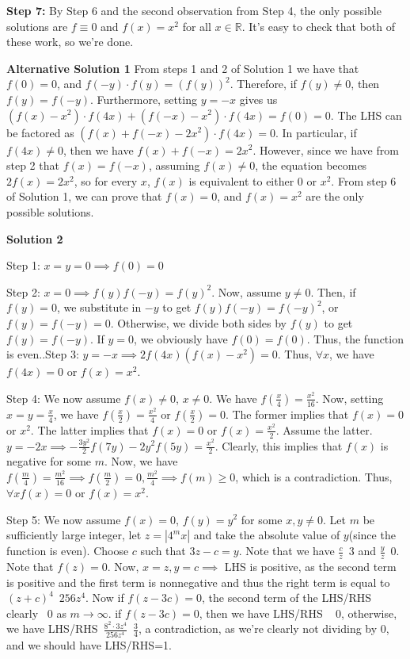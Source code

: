 \begin{enumerate}
 \textbf{Step 7:} By Step 6 and the second observation from Step 4, the only possible solutions are $f \equiv 0$ and $f(x) = x^2$ for all $x \in \mathbb{R}.$ It's easy to check that both of these work, so we're done.

 \textbf{Alternative Solution 1} From steps 1 and 2 of Solution 1 we have that $f(0)=0$, and $f(-y) \cdot f(y)=(f(y))^2$. Therefore, if $f(y) \ne 0$, then $f(y)=f(-y)$. Furthermore, setting $y=-x$ gives us $(f(x)-x^2) \cdot f(4x) + (f(-x)-x^2) \cdot f(4x) = f(0) = 0$. The LHS can be factored as $(f(x)+f(-x)-2x^2) \cdot f(4x) = 0$. In particular, if $f(4x) \ne 0$, then we have $f(x)+f(-x)=2x^2$. However, since we have from step 2 that $f(x)=f(-x)$, assuming $f(x) \ne 0$, the equation becomes $2f(x)=2x^2$, so for every $x$, $f(x)$ is equivalent to either $0$ or $x^2$. From step 6 of Solution 1, we can prove that $f(x)=0$, and $f(x)=x^2$ are the only possible solutions.

 



\textbf{Solution 2}

Step 1: $x=y=0 \implies f(0)=0$

 Step 2: $x=0 \implies f(y)f(-y)=f(y)^{2}$. Now, assume $y \not = 0$. Then, if $f(y)=0$, we substitute in $-y$ to get $f(y)f(-y)=f(-y)^{2}$, or $f(y)=f(-y)=0$. Otherwise, we divide both sides by $f(y)$ to get $f(y)=f(-y)$. If $y=0$, we obviously have $f(0)=f(0)$. Thus, the function is even..Step 3: $y=-x \implies 2f(4x)(f(x)-x^{2})=0$. Thus, $\forall x$, we have $f(4x)=0$ or $f(x)=x^{2}$.

 Step 4: We now assume $f(x) \not = 0$, $x\not = 0$. We have $f(\frac{x}{4})=\frac{x^{2}}{16}$. Now, setting $x=y=\frac{x}{4}$, we have $f(\frac{x}{2})=\frac{x^{2}}{4}$ or $f(\frac{x}{2})=0$. The former implies that $f(x)=0$ or $x^{2}$. The latter implies that $f(x)=0$ or $f(x)=\frac{x^{2}}{2}$. Assume the latter. $y=-2x \implies -\frac{3y^{2}}{2}f(7y)-{2y^{2}}f(5y)=\frac{x^{2}}{2}$. Clearly, this implies that $f(x)$ is negative for some $m$. Now, we have $f(\frac{m}{4})=\frac{m^{2}}{16} \implies f(\frac{m}{2})=0,\frac{m^{2}}{4} \implies f(m) \geq 0$, which is a contradiction. Thus, $\forall x$$f(x)=0$ or $f(x)=x^{2}$.

 Step 5: We now assume $f(x)=0$, $f(y)=y^{2}$ for some $x,y \not = 0$. Let $m$ be sufficiently large integer, let $z=|4^{m}x|$ and take the absolute value of $y$(since the function is even). Choose $c$ such that $3z-c=y$. Note that we have $\frac{c}{z}$~$3$ and $\frac{y}{z}$~$0$. Note that $f(z)=0$. Now, $x=z, y=c \implies$ LHS is positive, as the second term is positive and the first term is nonnegative and thus the right term is equal to $(z+c)^{4}$~$256z^{4}$. Now if $f(z-3c)=0$, the second term of the LHS/RHS clearly ~0 as $m \to \infty$. if $f(z-3c)=0$, then we have LHS/RHS ~ $0$, otherwise, we have LHS/RHS~$\frac{8^{2}\cdot 3z^{4}}{256z^{4}}$~$\frac{3}{4}$, a contradiction, as we're clearly not dividing by $0$, and we should have LHS/RHS=1.


\end{enumerate}

